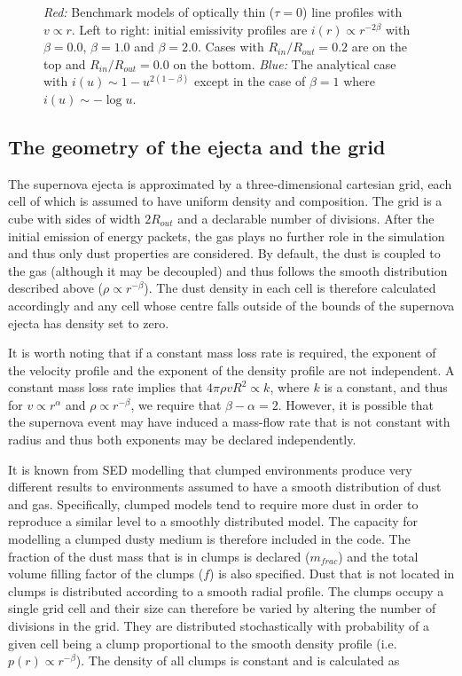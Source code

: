 \documentclass[useAMS,usenatbib,usegraphicx]{mnras}
\begin{document}
\begin{figure}
\caption{\textit{Red:} Benchmark models of optically thin ($\tau =0$) 
line profiles  with $v \propto r$. Left to right: initial emissivity 
profiles are $i(r) \propto r^{-2\beta}$ with $\beta=0.0$, $\beta=1.0$ and 
$\beta=2.0$. Cases with $R_{in}/R_{out}=0.2$ are on the top and 
$R_{in}/R_{out}=0.0$ on the bottom.  \textit{Blue:} The analytical case 
with $i(u) \sim 1-u^{2(1-\beta)}$ except in the case of $\beta=1$ where 
$i(u) \sim -\log u$.}
\label{fig:analytics}
\end{figure}

\subsection{The geometry of the ejecta and the grid}
\label{grid}

The supernova ejecta is approximated by a three-dimensional cartesian 
grid, each cell of which is assumed to have uniform density and 
composition.  The grid is a cube with sides of width $2R_{out}$ and a 
declarable number of divisions.  After the initial emission of energy 
packets, the gas plays no further role in the simulation and thus only 
dust properties are considered.  By default, the dust is coupled to the 
gas (although it may be decoupled) and thus follows the smooth 
distribution described above ($\rho \propto r^{-\beta}$).  The dust 
density in each cell is therefore calculated accordingly and any cell 
whose centre falls outside of the bounds of the supernova ejecta has 
density set to zero.

It is worth noting that if a constant mass loss rate is required, the 
exponent of the velocity profile and the exponent of the density profile 
are not independent.  A constant mass loss rate implies that $4\pi \rho 
vR^2 \propto k$, where $k$ is a constant, and thus for $v \propto 
r^\alpha$ and $\rho\propto r^{-\beta}$, we require that $\beta-\alpha=2$.  
However, it is possible that the supernova event may have induced a 
mass-flow rate that is not constant with radius and thus both exponents 
may be declared independently.

It is known from SED modelling that clumped environments produce very 
different results to environments assumed to have a smooth distribution of 
dust and gas.  Specifically, clumped models tend to require more dust in 
order to reproduce a similar level to a smoothly distributed model.  The 
capacity for modelling a clumped dusty medium is therefore included in the 
code.  The fraction of the dust mass that is in clumps is declared 
($m_{frac}$) and the total volume filling factor of the clumps ($f$) is 
also specified.  Dust that is not located in clumps is distributed 
according to a smooth radial profile.  The clumps occupy a single grid 
cell and their size can therefore be varied by altering the number of 
divisions in the grid.  They are distributed stochastically with 
probability of a given cell being a clump proportional to the smooth 
density profile (i.e. $p(r) \propto r^{-\beta}$).  The density of all 
clumps is constant and is calculated as
\end{document}
